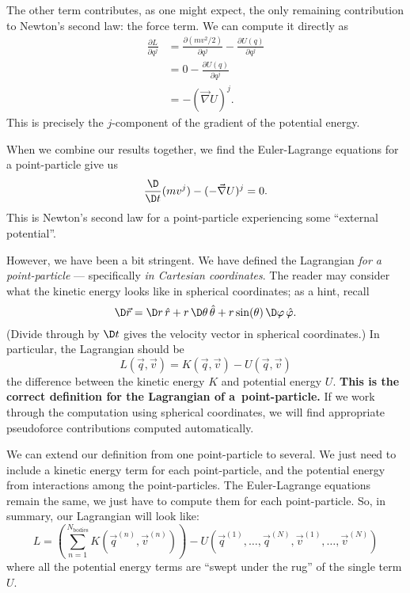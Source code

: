 \M
The other term contributes, as one might expect, the only remaining
contribution to Newton's second law: the force term. We can compute it
directly as
\begin{subequations}
\begin{align}
\frac{\partial L}{\partial q^{j}}
&= \frac{\partial (mv^{2}/2)}{\partial q^{j}} - \frac{\partial U(q)}{\partial q^{j}}\\
&= 0 - \frac{\partial U(q)}{\partial q^{j}}\\
&= -(\vec{\nabla}U)^{j}.
\end{align}
\end{subequations}
This is precisely the $j$-component of the gradient of the potential energy.

When we combine our results together, we find the Euler-Lagrange
equations for a point-particle give us
\begin{equation}
\frac{\D}{\D t}(m v^{j}) - (-\vec{\nabla}U)^{j} = 0.
\end{equation}
This is Newton's second law for a point-particle experiencing some
``external potential''.

However, we have been a bit stringent. We have defined the Lagrangian
\emph{for a point-particle} --- specifically \emph{in Cartesian coordinates}.
The reader may consider what the kinetic energy looks like in spherical
coordinates; as a hint, recall
\begin{equation}
\D\vec{r} = \D r\,\hat{r} + r\,\D\theta\,\hat{\theta} + r\sin(\theta)\,\D\varphi\,\hat{\varphi}.
\end{equation}
(Divide through by $\D t$ gives the velocity vector in spherical
coordinates.)
In particular, the Lagrangian should be
\begin{equation}
L(\vec{q},\vec{v}) = K(\vec{q},\vec{v}) - U(\vec{q},\vec{v})
\end{equation}
the difference between the kinetic energy $K$ and potential energy
$U$. \textbf{This is the correct definition for the Lagrangian of a\ point-particle.}
If we work through the computation using spherical coordinates, we will
find appropriate pseudoforce contributions computed automatically.

We can extend our definition from one point-particle to several. We just
need to include a kinetic energy term for each point-particle, and the
potential energy from interactions among the point-particles. The
Euler-Lagrange equations remain the same, we just have to compute them
for each point-particle. So, in summary, our Lagrangian will look like:
\begin{equation}
L = \left(\sum^{N_{\text{bodies}}}_{n=1}K(\vec{q}^{(n)},\vec{v}^{(n)})\right)
-U(\vec{q}^{(1)},\dots,\vec{q}^{(N)},\vec{v}^{(1)},\dots,\vec{v}^{(N)})
\end{equation}
where all the potential energy terms are ``swept under the rug'' of the
single term $U$.

